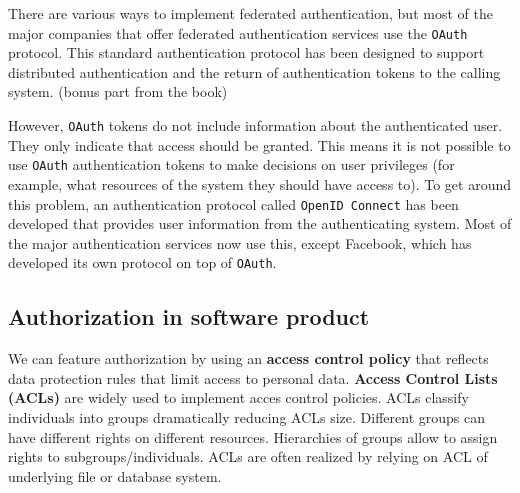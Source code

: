 There are various ways to implement federated authentication, but most of the major companies that offer federated authentication services use the \texttt{OAuth} protocol. This standard authentication protocol has been designed to support distributed authentication and the return of authentication tokens to the calling system.
(bonus part from the book)

However, \texttt{OAuth} tokens do not include information about the authenticated user. They only indicate that access should be granted. This means it is not possible to use \texttt{OAuth} authentication tokens to make decisions on user privileges (for example, what resources of the system they should have access to). To get around this problem, an authentication protocol called \texttt{OpenID Connect} has been developed that provides user information from the authenticating system. Most of the major authentication services now use this, except Facebook, which has developed its own protocol on top of \texttt{OAuth}.


\subsection{Authorization in software product}
We can feature authorization by using an \textbf{access control policy} that reflects data protection rules that limit access to personal data. \textbf{Access Control Lists (ACLs)} are widely used to implement acces control policies. ACLs classify individuals into groups dramatically reducing ACLs size. Different groups can have different rights on different resources. Hierarchies of groups allow to assign rights to subgroups/individuals. ACLs are often realized by relying on ACL of underlying file or database system.


